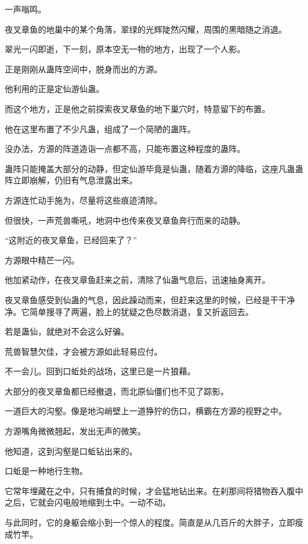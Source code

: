 
\begin{this_body}



一声嗡鸣。

夜叉章鱼的地巢中的某个角落，翠绿的光辉陡然闪耀，周围的黑暗随之消退。

翠光一闪即逝，下一刻，原本空无一物的地方，出现了一个人影。

正是刚刚从蛊阵空间中，脱身而出的方源。

他利用的正是定仙游仙蛊。

而这个地方，正是他之前探索夜叉章鱼的地下巢穴时，特意留下的布置。

他在这里布置了不少凡蛊，组成了一个简陋的蛊阵。

没办法，方源的阵道造诣一点都不高，只能布置这种程度的蛊阵。

蛊阵只能掩盖大部分的动静，但定仙游毕竟是仙蛊，随着方源的降临，这座凡蛊蛊阵立即崩解，仍旧有气息泄露出来。

方源连忙动手施为，尽量将这些痕迹清除。

但很快，一声荒兽嘶吼，地洞中也传来夜叉章鱼奔行而来的动静。

“这附近的夜叉章鱼，已经回来了？”

方源眼中精芒一闪。

他加紧动作，在夜叉章鱼赶来之前，清除了仙蛊气息后，迅速抽身离开。

夜叉章鱼感受到仙蛊的气息，因此躁动而来，但赶来这里的时候，已经是干干净净。它简单搜寻了两遍，脸上的犹疑之色尽数消退，复又折返回去。

若是蛊仙，就绝对不会这么好骗。

荒兽智慧欠佳，才会被方源如此轻易应付。

不一会儿。回到口蚯处的战场，这里已是一片狼藉。

大部分的夜叉章鱼都已经撤退，而北原仙僵们也不见了踪影。

一道巨大的沟壑。像是地沟峭壁上一道狰狞的伤口，横霸在方源的视野之中。

方源嘴角微微翘起，发出无声的微笑。

他知道，这到沟壑是口蚯钻出来的。

口蚯是一种地行生物。

它常年埋藏在之中，只有捕食的时候，才会猛地钻出来。在刹那间将猎物吞入腹中之后，它就会闪电般地缩到土中。一动不动。

与此同时，它的身躯会缩小到一个惊人的程度。简直是从几百斤的大胖子，立即瘦成竹竿。


\end{this_body}
